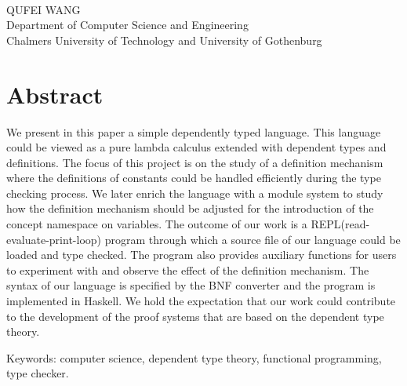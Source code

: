 \oneLineTitle\\
QUFEI WANG\\
Department of Computer Science and Engineering\\
Chalmers University of Technology and University of Gothenburg\setlength{\parskip}{0.5cm}

\thispagestyle{plain}			%
\setlength{\parskip}{0pt plus 1.0pt}
\section*{Abstract}
We present in this paper a simple dependently typed language. This language could be viewed as a pure lambda calculus extended with dependent types and definitions. The focus of this project is on the study of a definition mechanism where the definitions of constants could be handled efficiently during the type checking process. We later enrich the language with a module system to study how the definition mechanism should be adjusted for the introduction of the concept namespace on variables. The outcome of our work is a REPL(read-evaluate-print-loop) program through which a source file of our language could be loaded and type checked. The program also provides auxiliary functions for users to experiment with and observe the effect of the definition mechanism. The syntax of our language is specified by the BNF converter and the program is implemented in Haskell. We hold the expectation that our work could contribute to the development of the proof systems that are based on the dependent type theory.

\vfill
Keywords: computer science, dependent type theory, functional programming, type checker.

\newpage				%
\thispagestyle{empty}
\mbox{}